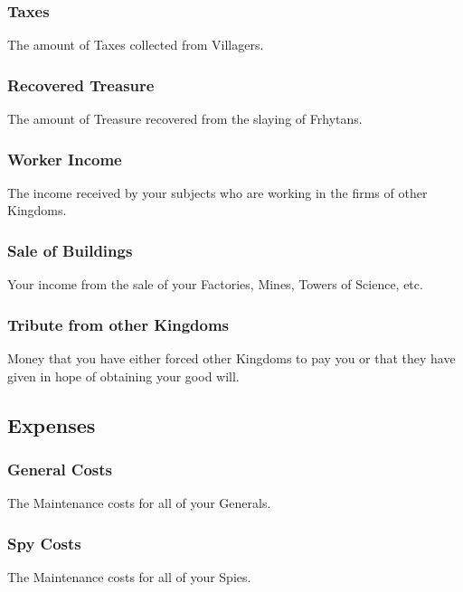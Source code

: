 \subsubsection{Taxes}

The amount of Taxes collected from Villagers.

\subsubsection{Recovered Treasure}

The amount of Treasure recovered from the slaying of Frhytans.

\subsubsection{Worker Income}

The income received by your subjects who are working in the firms of other Kingdoms.

\subsubsection{Sale of Buildings}

Your income from the sale of your Factories, Mines, Towers of Science, etc.

\subsubsection{Tribute from other Kingdoms}

Money that you have either forced other Kingdoms to pay you or that they have given in hope of obtaining your good will.

\subsection{Expenses}


\subsubsection{General Costs}

The Maintenance costs for all of your Generals.

\subsubsection{Spy Costs}

The Maintenance costs for all of your Spies.


